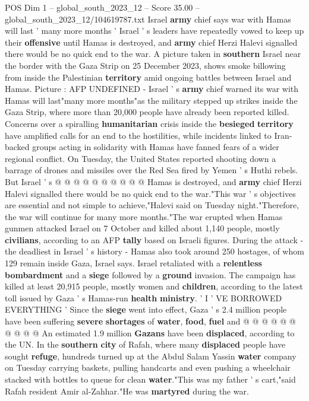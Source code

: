 \begin{textsample}{POS Dim 1 – global\_south\_2023\_12 – Score 35.00 – global\_south\_2023\_12/104619787.txt}  \label{ex:f1_pos_038}
Israel \textbf{army} chief says war with Hamas will last ' many more months ' Israel ' s leaders have repeatedly vowed to keep up their \textbf{offensive} until Hamas is destroyed, and \textbf{army} chief Herzi Halevi signalled there would be no quick end to the war.
A picture taken in \textbf{southern} Israel near the border with the Gaza Strip on 25 December 2023, shows smoke billowing from inside the Palestinian \textbf{territory} amid ongoing battles between Israel and Hamas.
Picture : AFP UNDEFINED - Israel ' s \textbf{army} chief warned its war with Hamas will last"many more months"as the military stepped up strikes inside the Gaza Strip, where more than 20,000 people have already been reported killed.
Concerns over a spiralling \textbf{humanitarian} crisis inside the \textbf{besieged} \textbf{territory} have amplified calls for an end to the hostilities, while incidents linked to Iran-backed groups acting in solidarity with Hamas have fanned fears of a wider regional conflict.
On Tuesday, the United States reported shooting down a barrage of drones and missiles over the Red Sea fired by Yemen ' s Huthi rebels.
But Israel ' s @ @ @ @ @ @ @ @ @ @ Hamas is destroyed, and \textbf{army} chief Herzi Halevi signalled there would be no quick end to the war."This war ' s objectives are essential and not simple to achieve,"Halevi said on Tuesday night."Therefore, the war will continue for many more months."The war erupted when Hamas gunmen attacked Israel on 7 October and killed about 1,140 people, mostly \textbf{civilians}, according to an AFP \textbf{tally} based on Israeli figures.
During the attack - the deadliest in Israel ' s history - Hamas also took around 250 hostages, of whom 129 remain inside Gaza, Israel says.
Israel retaliated with a \textbf{relentless} \textbf{bombardment} and a \textbf{siege} followed by a \textbf{ground} invasion.
The campaign has killed at least 20,915 people, mostly women and \textbf{children}, according to the latest toll issued by Gaza ' s Hamas-run \textbf{health} \textbf{ministry}. ' I ' VE BORROWED EVERYTHING ' Since the \textbf{siege} went into effect, Gaza ' s 2.4 million people have been suffering \textbf{severe} \textbf{shortages} of \textbf{water}, \textbf{food}, \textbf{fuel} and @ @ @ @ @ @ @ @ @ @ An estimated 1.9 million \textbf{Gazans} have been \textbf{displaced}, according to the UN.
In the \textbf{southern} \textbf{city} of Rafah, where many \textbf{displaced} people have sought \textbf{refuge}, hundreds turned up at the Abdul Salam Yassin \textbf{water} company on Tuesday carrying baskets, pulling handcarts and even pushing a wheelchair stacked with bottles to queue for clean \textbf{water}."This was my father ' s cart,"said Rafah resident Amir al-Zahhar."He was \textbf{martyred} during the war.

\end{textsample}
